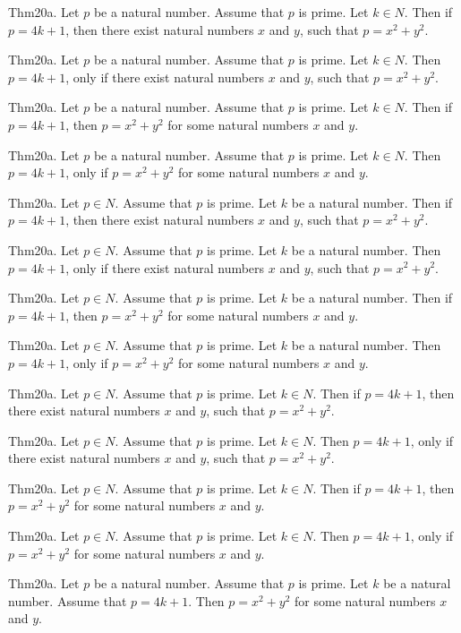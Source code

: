 \documentclass{article}
\begin{document}
Thm20a. Let $p$ be a natural number. Assume that $p$ is prime. Let $k \in N$. Then if $p = 4 k + 1$, then there exist natural numbers $x$ and $y$, such that $p = x ^{ 2}+ y ^{ 2}$.

Thm20a. Let $p$ be a natural number. Assume that $p$ is prime. Let $k \in N$. Then $p = 4 k + 1$, only if there exist natural numbers $x$ and $y$, such that $p = x ^{ 2}+ y ^{ 2}$.

Thm20a. Let $p$ be a natural number. Assume that $p$ is prime. Let $k \in N$. Then if $p = 4 k + 1$, then $p = x ^{ 2}+ y ^{ 2}$ for some natural numbers $x$ and $y$.

Thm20a. Let $p$ be a natural number. Assume that $p$ is prime. Let $k \in N$. Then $p = 4 k + 1$, only if $p = x ^{ 2}+ y ^{ 2}$ for some natural numbers $x$ and $y$.

Thm20a. Let $p \in N$. Assume that $p$ is prime. Let $k$ be a natural number. Then if $p = 4 k + 1$, then there exist natural numbers $x$ and $y$, such that $p = x ^{ 2}+ y ^{ 2}$.

Thm20a. Let $p \in N$. Assume that $p$ is prime. Let $k$ be a natural number. Then $p = 4 k + 1$, only if there exist natural numbers $x$ and $y$, such that $p = x ^{ 2}+ y ^{ 2}$.

Thm20a. Let $p \in N$. Assume that $p$ is prime. Let $k$ be a natural number. Then if $p = 4 k + 1$, then $p = x ^{ 2}+ y ^{ 2}$ for some natural numbers $x$ and $y$.

Thm20a. Let $p \in N$. Assume that $p$ is prime. Let $k$ be a natural number. Then $p = 4 k + 1$, only if $p = x ^{ 2}+ y ^{ 2}$ for some natural numbers $x$ and $y$.

Thm20a. Let $p \in N$. Assume that $p$ is prime. Let $k \in N$. Then if $p = 4 k + 1$, then there exist natural numbers $x$ and $y$, such that $p = x ^{ 2}+ y ^{ 2}$.

Thm20a. Let $p \in N$. Assume that $p$ is prime. Let $k \in N$. Then $p = 4 k + 1$, only if there exist natural numbers $x$ and $y$, such that $p = x ^{ 2}+ y ^{ 2}$.

Thm20a. Let $p \in N$. Assume that $p$ is prime. Let $k \in N$. Then if $p = 4 k + 1$, then $p = x ^{ 2}+ y ^{ 2}$ for some natural numbers $x$ and $y$.

Thm20a. Let $p \in N$. Assume that $p$ is prime. Let $k \in N$. Then $p = 4 k + 1$, only if $p = x ^{ 2}+ y ^{ 2}$ for some natural numbers $x$ and $y$.

Thm20a. Let $p$ be a natural number. Assume that $p$ is prime. Let $k$ be a natural number. Assume that $p = 4 k + 1$. Then $p = x ^{ 2}+ y ^{ 2}$ for some natural numbers $x$ and $y$.
\end{document}
